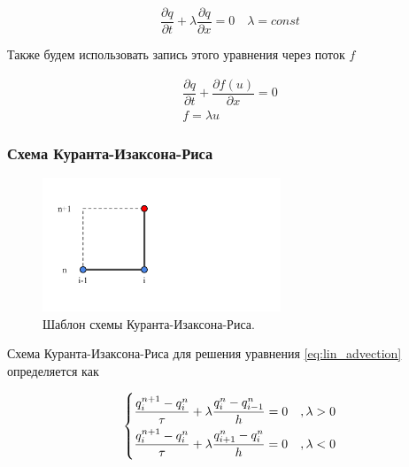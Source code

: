 \begin{equation}
    \dfrac{\partial q}{\partial t} + \lambda \dfrac{\partial q}{\partial x} = 0 \quad \lambda =const
    \label{eq:lin_advection}
\end{equation}

Также будем использовать запись этого уравнения через поток $f$

\begin{equation}
\begin{gathered}
    \dfrac{\partial q}{\partial t} + \dfrac{\partial f (u)}{\partial x} = 0 \\
    f = \lambda u
\end{gathered}
\label{eq:lin_advection_flux}
\end{equation}

\subsubsection{Схема Куранта-Изаксона-Риса}

\begin{figure}[htb]
    \centering
    \includegraphics[trim={55pt 100pt 530pt 100pt},clip,height=4cm]{images/theory/scheme_cir.png}
    \caption{Шаблон схемы Куранта-Изаксона-Риса.}
    \label{fig:scheme_cir}
\end{figure}

Схема Куранта-Изаксона-Риса для решения уравнения \eqref{eq:lin_advection} определяется как \cite{cir_scheme} \cite{petrov_lobanov_book}

\begin{equation*}
\begin{dcases}
    \dfrac{q_i^{n+1} - q_i^n}{\tau} + \lambda\dfrac{q_i^n - q_{i-1}^n}{h} = 0 & , \lambda > 0\\
    \dfrac{q_i^{n+1} - q_i^n}{\tau} + \lambda\dfrac{q_{i+1}^n - q_i^n}{h} = 0  & , \lambda < 0
\end{dcases}
\end{equation*}

